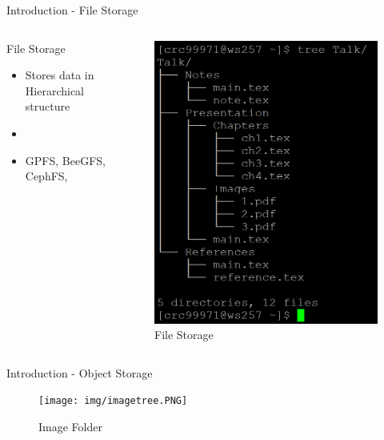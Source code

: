 \begin{frame}{Introduction - File Storage}

\begin{columns}
    \begin{column}{0.47\textwidth}
    \begin{block}{File Storage}
        \begin{itemize}
            \item Stores data in  Hierarchical structure
            \item 
            \item GPFS, BeeGFS, CephFS,
            
        \end{itemize}
    \end{block}
    \end{column}
    \begin{column}{0.47\textwidth}
        \begin{figure}
        \centering
        \includegraphics[width=\textwidth,height=0.7\textheight,keepaspectratio]{img/tree.PNG}
        \caption{File Storage}
        \label{fig:my_label}
    \end{figure}
    \end{column}
\end{columns}
\end{frame}
\begin{frame}{Introduction - Object Storage}
    \begin{figure}
        \centering
        \texttt{[image: img/imagetree.PNG]}
        \caption{Image Folder}
        \label{fig:my_label}
    \end{figure}  
\end{frame}


